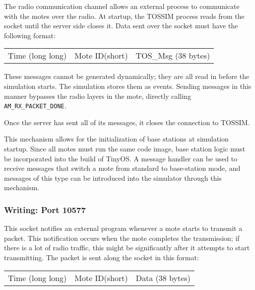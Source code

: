 \documentclass[12pt]{article}
\begin{document}
The radio communication channel allows an external process to
communicate with the motes over the radio. At startup, the TOSSIM
process reads from the socket until the server side closes it. Data
sent over the socket must have the following format:

\vspace{0.1in}
\begin{tabular}{|c|c|c|}\hline
\hspace{2in} & \hspace{2in} & \hspace{0.5in} \\ \hline
Time (long long)& Mote ID(short) & TOS\_Msg (38 bytes) \\ \hline
\end{tabular}
\vspace{0.1in}

These messages cannot be generated dynamically; they are all read in
before the simulation starts. The simulation stores them as
events. Sending messages in this manner bypasses the radio layers in
the mote, directly calling {\tt AM\_RX\_PACKET\_DONE}.

Once the server has sent all of its messages, it closes the connection
to TOSSIM.

This mechanism allows for the initialization of base stations at
simulation startup. Since all motes must run the same code image, base
station logic must be incorporated into the build of TinyOS. A message
handler can be used to receive messages that switch a mote from
standard to base-station mode, and messages of this type can be
introduced into the simulator through this mechanism.

\subsubsection*{Writing: Port 10577}

This socket notifies an external program whenever a mote starts to
transmit a packet. This notification occurs when the mote completes
the transmission; if there is a lot of radio traffic, this might be
significantly after it attempts to start transmitting. The packet is
sent along the socket in this format:

\vspace{0.1in}
\begin{tabular}{|c|c|c|}\hline
\hspace{2in} & \hspace{2in} & \hspace{0.5in} \\ \hline
Time (long long)& Mote ID(short) & Data (38 bytes) \\ \hline
\end{tabular}
\vspace{0.1in}
\end{document}

